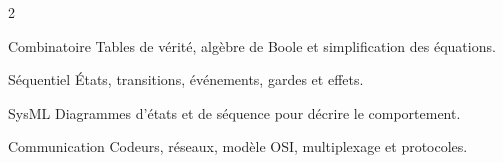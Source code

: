 \documentclass[a3paper,landscape,10pt]{article}
\begin{document}
\begin{multicols}{2}
\begin{TLPosterBloc}{Combinatoire}
Tables de vérité, algèbre de Boole et simplification des équations.
\end{TLPosterBloc}

\begin{TLPosterBloc}{Séquentiel}
États, transitions, événements, gardes et effets.
\end{TLPosterBloc}

\begin{TLPosterBloc}{SysML}
Diagrammes d'états et de séquence pour décrire le comportement.
\end{TLPosterBloc}

\begin{TLPosterBloc}{Communication}
Codeurs, réseaux, modèle OSI, multiplexage et protocoles.
\end{TLPosterBloc}
\end{multicols}
\end{document}
